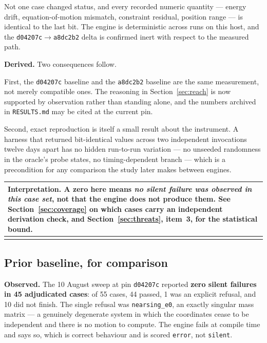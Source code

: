 \documentclass[11pt,a4paper]{article}
\makeatletter
\newenvironment{callout}
  {\par\medskip\noindent\begin{tabular}{@{}p{0.94\textwidth}@{}}
   \arrayrulecolor{warnrule}\hline\rule{0pt}{2.6ex}}
  {\\[0.8ex]\hline\arrayrulecolor{black}\end{tabular}\par\medskip}
\newcommand{\gitsha}[1]{\texttt{#1}}
\makeatother
\begin{document}
\noindent Not one case changed status, and every recorded numeric quantity ---
energy drift, equation-of-motion mismatch, constraint residual, position range
--- is identical to the last bit. The engine is deterministic across runs on
this host, and the \gitsha{d04207c}$\rightarrow$\gitsha{a8dc2b2} delta is
confirmed inert with respect to the measured path.

\noindent\textbf{Derived.} Two consequences follow.

First, the \gitsha{d04207c} baseline and the \gitsha{a8dc2b2} baseline are the
same measurement, not merely compatible ones. The reasoning in
Section~\ref{sec:reach} is now supported by observation rather than standing
alone, and the numbers archived in \texttt{RESULTS.md} may be cited at the
current pin.

Second, exact reproduction is itself a small result about the instrument.
A harness that returned bit-identical values across two independent
invocations twelve days apart has no hidden run-to-run variation --- no
unseeded randomness in the oracle's probe states, no timing-dependent
branch --- which is a precondition for any comparison the study later makes
between engines.

\begin{callout}
\textbf{Interpretation.} A zero here means \emph{no silent failure was observed
in this case set}, not that the engine does not produce them. See
Section~\ref{sec:coverage} on which cases carry an independent derivation
check, and Section~\ref{sec:threats}, item~3, for the statistical bound.
\end{callout}

\subsection{Prior baseline, for comparison}

\noindent\textbf{Observed.} The 10 August sweep at pin \gitsha{d04207c}
reported \textbf{zero silent failures in 45 adjudicated cases}: of 55 cases, 44
passed, 1 was an explicit refusal, and 10 did not finish. The single refusal was
\texttt{nearsing\_e0}, an exactly singular mass matrix --- a genuinely
degenerate system in which the coordinates cease to be independent and there is
no motion to compute. The engine fails at compile time and says so, which is
correct behaviour and is scored \texttt{error}, not \texttt{silent}.

\end{document}
